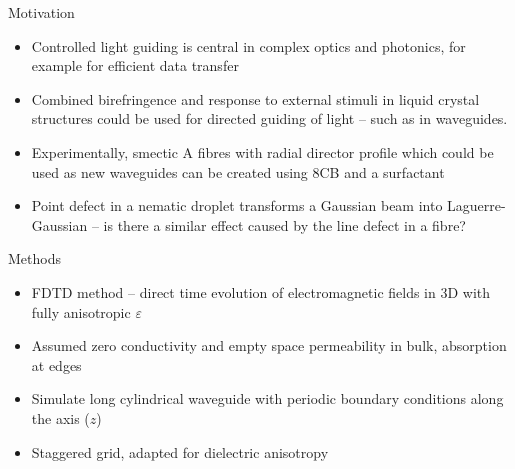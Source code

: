 \documentclass[8pt]{beamer}
\newlength{\wideitemsep}
\let\olditem\item
\renewcommand{\item}{\setlength{\itemsep}{\wideitemsep}\olditem}
\newcommand{\blockpadding}{
  \rule[-0.6ex]{0pt}{2.5ex}
}
\begin{document}
\begin{columns}[t]
 \begin{column}{.36\textwidth}
\begin{block}{\blockpadding Motivation}
\begin{itemize}
 \item Controlled light guiding is central in complex optics and photonics, for example for efficient data transfer
 \item Combined birefringence and response to external stimuli in liquid crystal structures could be used for directed guiding of light -- such as in waveguides\citep{lasers}.
 \item Experimentally, smectic A fibres with radial director profile which could be used as new waveguides can be created using 8CB and a surfactant
 \item Point defect in a nematic droplet transforms a Gaussian beam into Laguerre-Gaussian\citep{brasselet} -- is there a similar effect caused by the line defect in a fibre?
\end{itemize}
\end{block}

\begin{block}{\blockpadding Methods}
 \begin{itemize}
  \item FDTD method\citep{taflove} -- direct time evolution of electromagnetic fields in 3D with fully anisotropic $\varepsilon$
  \item Assumed zero conductivity and empty space permeability in bulk, absorption at edges
  \item Simulate long cylindrical waveguide with periodic boundary conditions along the axis ($z$)
  \item Staggered grid, adapted for dielectric anisotropy
  \begin{figure}[h]
\centering
\end{figure}
\end{itemize}
\end{block}
\end{column}
\end{columns}
\end{document}
